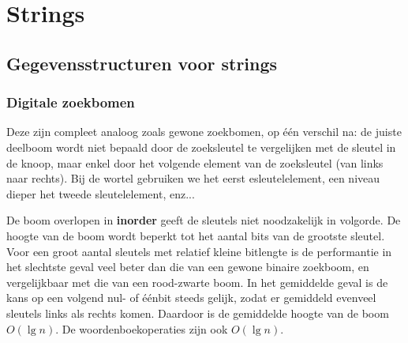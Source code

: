 \documentclass{report}
\begin{document}
\begin{itemize}
\end{itemize}


\part{Strings}
\chapter{Gegevensstructuren voor strings}
\section{Digitale zoekbomen}
Deze zijn compleet analoog zoals gewone zoekbomen, op één verschil na: de juiste deelboom wordt niet bepaald door de zoeksleutel te vergelijken met de sleutel in de knoop, maar enkel door het volgende element van de zoeksleutel (van links naar rechts). Bij de wortel gebruiken we het eerst esleutelelement, een niveau dieper het tweede sleutelelement, enz...

De boom overlopen in \textbf{inorder} geeft de sleutels niet noodzakelijk in volgorde. De hoogte van de boom wordt beperkt tot het aantal bits van de grootste sleutel. Voor een groot aantal sleutels met relatief kleine bitlengte is de performantie in het slechtste geval veel beter dan die van een gewone binaire zoekboom, en vergelijkbaar met die van een rood-zwarte boom. In het gemiddelde geval is de kans op een volgend nul- of éénbit steeds gelijk, zodat er gemiddeld evenveel sleutels links als rechts komen. Daardoor is de gemiddelde hoogte van de boom $O(\lg n)$. De woordenboekoperaties zijn ook $O(\lg n)$.
\end{document}
